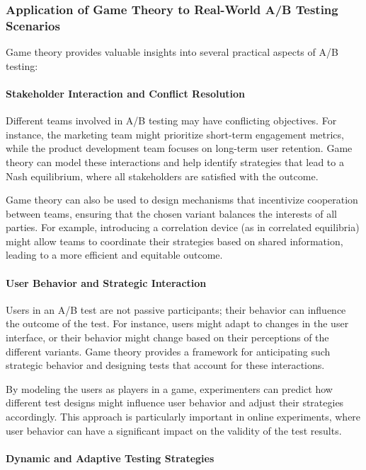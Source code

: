 \documentclass[magisterska, english]{pwr_wmat_praca_dyplomowa}
\theoremstyle{plain}
\numberwithin{theorem}{chapter}
\theoremstyle{definition}
\numberwithin{theorem}{chapter}
\begin{document}
\subsubsection{Application of Game Theory to Real-World A/B Testing Scenarios}

Game theory provides valuable insights into several practical aspects of A/B testing:

\paragraph{Stakeholder Interaction and Conflict Resolution}

Different teams involved in A/B testing may have conflicting objectives. For instance, the marketing team might prioritize short-term engagement metrics, while the product development team focuses on long-term user retention. Game theory can model these interactions and help identify strategies that lead to a Nash equilibrium, where all stakeholders are satisfied with the outcome.

Game theory can also be used to design mechanisms that incentivize cooperation between teams, ensuring that the chosen variant balances the interests of all parties. For example, introducing a correlation device (as in correlated equilibria) might allow teams to coordinate their strategies based on shared information, leading to a more efficient and equitable outcome.

\paragraph{User Behavior and Strategic Interaction}

Users in an A/B test are not passive participants; their behavior can influence the outcome of the test. For instance, users might adapt to changes in the user interface, or their behavior might change based on their perceptions of the different variants. Game theory provides a framework for anticipating such strategic behavior and designing tests that account for these interactions.

By modeling the users as players in a game, experimenters can predict how different test designs might influence user behavior and adjust their strategies accordingly. This approach is particularly important in online experiments, where user behavior can have a significant impact on the validity of the test results.

\paragraph{Dynamic and Adaptive Testing Strategies}
\end{document}
